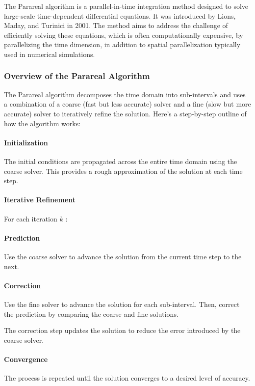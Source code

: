 \documentclass{article}
\begin{document}
   The Parareal algorithm is a parallel-in-time integration method designed to solve large-scale time-dependent differential equations. It was introduced by Lions, Maday, and Turinici in 2001. The method aims to address the challenge of efficiently solving these equations, which is often computationally expensive, by parallelizing the time dimension, in addition to spatial parallelization typically used in numerical simulations.
   \subsubsection{Overview of the Parareal Algorithm}
   
   The Parareal algorithm decomposes the time domain into sub-intervals and uses a combination of a coarse (fast but less accurate) solver and a fine (slow but more accurate) solver to iteratively refine the solution. Here's a step-by-step outline of how the algorithm works:
   
   \paragraph{Initialization}
   The initial conditions are propagated across the entire time domain using the coarse solver. This provides a rough approximation of the solution at each time step.
   \paragraph{Iterative Refinement}
   For each iteration $k$ :
   \paragraph{Prediction} Use the coarse solver to advance the solution from the current time step to the next.
   \paragraph{Correction}  Use the fine solver to advance the solution for each sub-interval. Then, correct the prediction by comparing the coarse and fine solutions.
   
   The correction step updates the solution to reduce the error introduced by the coarse solver.
   \paragraph{Convergence}
   The process is repeated until the solution converges to a desired level of accuracy.
\end{document}
